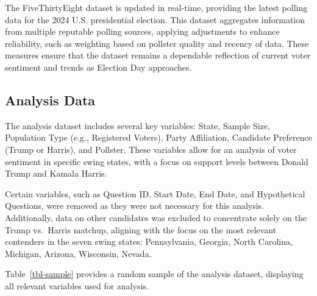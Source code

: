 \documentclass[
  letterpaper,
  DIV=11,
  numbers=noendperiod]{scrartcl}
\begin{document}
The FiveThirtyEight dataset is updated in real-time, providing the
latest polling data for the 2024 U.S. presidential election. This
dataset aggregates information from multiple reputable polling sources,
applying adjustments to enhance reliability, such as weighting based on
pollster quality and recency of data. These measures ensure that the
dataset remains a dependable reflection of current voter sentiment and
trends as Election Day approaches.

\hypertarget{analysis-data}{%
\subsection{Analysis Data}\label{analysis-data}}

The analysis dataset includes several key variables: State, Sample Size,
Population Type (e.g., Registered Voters), Party Affiliation, Candidate
Preference (Trump or Harris), and Pollster. These variables allow for an
analysis of voter sentiment in specific swing states, with a focus on
support levels between Donald Trump and Kamala Harris.

Certain variables, such as Question ID, Start Date, End Date, and
Hypothetical Questions, were removed as they were not necessary for this
analysis. Additionally, data on other candidates was excluded to
concentrate solely on the Trump vs.~Harris matchup, aligning with the
focus on the most relevant contenders in the seven swing states:
Pennsylvania, Georgia, North Carolina, Michigan, Arizona, Wisconsin,
Nevada.

Table~\ref{tbl-sample} provides a random sample of the analysis dataset,
displaying all relevant variables used for analysis.
\end{document}
